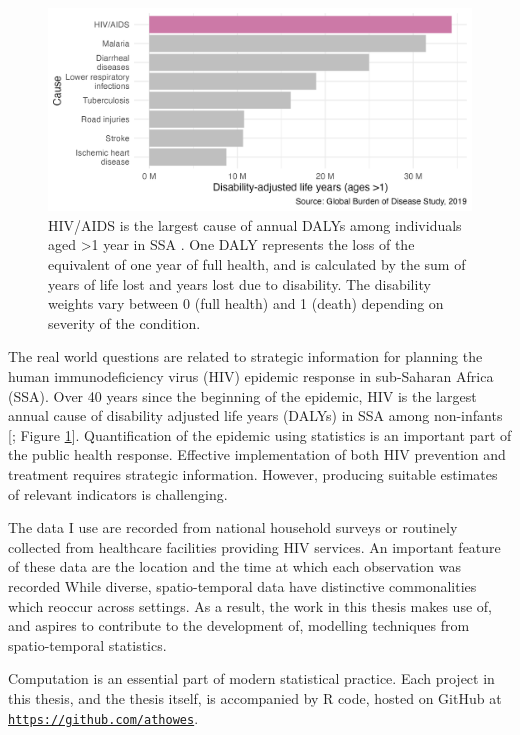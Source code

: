 \documentclass[a4paper, nobind]{templates/ociamthesis}
\begin{document}
\begin{figure}

{\centering \includegraphics[width=0.95\linewidth]{figures/introduction/gbd} 

}

\caption{HIV/AIDS is the largest cause of annual DALYs among individuals aged \textgreater1 year in SSA \autocite{ihme2019}. One DALY represents the loss of the equivalent of one year of full health, and is calculated by the sum of years of life lost and years lost due to disability. The disability weights vary between 0 (full health) and 1 (death) depending on severity of the condition.}\label{fig:gbd}
\end{figure}

The real world questions are related to strategic information for planning the human immunodeficiency virus (HIV) epidemic response in sub-Saharan Africa (SSA).
Over 40 years since the beginning of the epidemic, HIV is the largest annual cause of disability adjusted life years (DALYs) in SSA among non-infants {[}\textcite{ihme2019}; Figure \ref{fig:gbd}{]}.
Quantification of the epidemic using statistics is an important part of the public health response.
Effective implementation of both HIV prevention and treatment requires strategic information.
However, producing suitable estimates of relevant indicators is challenging.

The data I use are recorded from national household surveys or routinely collected from healthcare facilities providing HIV services.
An important feature of these data are the location and the time at which each observation was recorded
While diverse, spatio-temporal data have distinctive commonalities which reoccur across settings.
As a result, the work in this thesis makes use of, and aspires to contribute to the development of, modelling techniques from spatio-temporal statistics.

Computation is an essential part of modern statistical practice.
Each project in this thesis, and the thesis itself, is accompanied by R \autocite{r} code, hosted on GitHub at \href{https://github.com/athowes}{\texttt{https://github.com/athowes}}.
\end{document}
